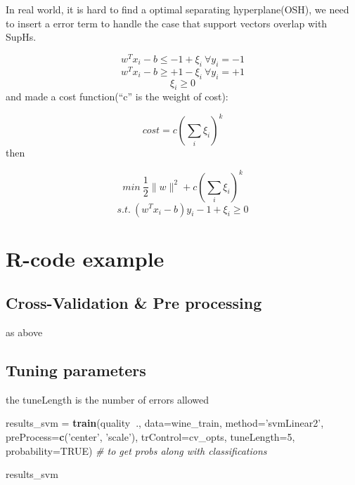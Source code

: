 \documentclass[]{book}
\newenvironment{Shaded}{\begin{snugshade}}{\end{snugshade}}
\newcommand{\KeywordTok}[1]{\textcolor[rgb]{0.13,0.29,0.53}{\textbf{#1}}}
\newcommand{\DataTypeTok}[1]{\textcolor[rgb]{0.13,0.29,0.53}{#1}}
\newcommand{\DecValTok}[1]{\textcolor[rgb]{0.00,0.00,0.81}{#1}}
\newcommand{\StringTok}[1]{\textcolor[rgb]{0.31,0.60,0.02}{#1}}
\newcommand{\CommentTok}[1]{\textcolor[rgb]{0.56,0.35,0.01}{\textit{#1}}}
\newcommand{\OtherTok}[1]{\textcolor[rgb]{0.56,0.35,0.01}{#1}}
\newcommand{\OperatorTok}[1]{\textcolor[rgb]{0.81,0.36,0.00}{\textbf{#1}}}
\newcommand{\NormalTok}[1]{#1}
\begin{document}
In real world, it is hard to find a optimal separating hyperplane(OSH), we need to insert a error term to handle the case that support vectors overlap with SupHs.

\[w^Tx_i-b\leq-1+\xi_i\  \forall y_i=-1\]
\[w^Tx_i-b\geq+1-\xi_i\  \forall y_i=+1\]
\[\xi_i\geq0\]
and made a cost function(``c'' is the weight of cost):

\[cost = c(\sum_i\xi_i)^k\]
then

\[min\ \frac{1}{2}\|w\|^2+c(\sum_i\xi_i)^k\]
\[s.t.\ (w^Tx_i-b)y_i-1+\xi_i\geq 0\]

\hypertarget{r-code-example}{%
\section{R-code example}\label{r-code-example}}

\hypertarget{cross-validation-pre-processing-2}{%
\subsection{Cross-Validation \& Pre processing}\label{cross-validation-pre-processing-2}}

as above

\hypertarget{tuning-parameters-2}{%
\subsection{Tuning parameters}\label{tuning-parameters-2}}

the tuneLength is the number of errors allowed

\begin{Shaded}
\begin{Highlighting}[]
\NormalTok{results_svm =}\StringTok{ }\KeywordTok{train}\NormalTok{(quality}\OperatorTok{~}\NormalTok{., }
                    \DataTypeTok{data=}\NormalTok{wine_train, }
                    \DataTypeTok{method=}\StringTok{'svmLinear2'}\NormalTok{,}
                    \DataTypeTok{preProcess=}\KeywordTok{c}\NormalTok{(}\StringTok{'center'}\NormalTok{, }\StringTok{'scale'}\NormalTok{), }
                    \DataTypeTok{trControl=}\NormalTok{cv_opts, }
                    \DataTypeTok{tuneLength=}\DecValTok{5}\NormalTok{,}
                    \DataTypeTok{probability=}\OtherTok{TRUE}\NormalTok{)  }\CommentTok{# to get probs along with classifications}

\NormalTok{results_svm}
\end{Highlighting}
\end{Shaded}
\end{document}
